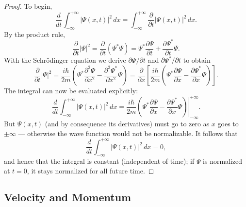 \documentclass{article}
\begin{document}
\begin{proof}
  To begin, \[
    \frac{d}{dt} \int_{-\infty}^{+\infty} |\Psi(x, t)|^2 \,dx
    = \int_{-\infty}^{+\infty} \frac{\partial}{\partial t} |\Psi(x, t)|^2 \,dx.
  \] By the product rule, \[
    \frac{\partial}{\partial t}|\Psi|^2
    = \frac{\partial}{\partial t} (\Psi^* \Psi)
    = \Psi^* \frac{\partial \Psi}{\partial t} +
    \frac{\partial \Psi^*}{\partial t} \Psi.
  \] With the Schr\"{o}dinger equation we derive $\partial\Psi/\partial t$ and
  $\partial\Psi^*/\partial t$ to obtain
  \begin{equation} \label{eq:sch-norm-1}
    \frac{\partial}{\partial t} |\Psi|^2
    = \frac{i\hbar}{2m} \left(
      \Psi^* \frac{\partial^2 \Psi}{\partial x^2} -
      \frac{\partial^2 \Psi^*}{\partial x^2} \Psi
    \right)
    = \frac{\partial}{\partial x} \left[
      \frac{i\hbar}{2m} \left(
        \Psi^* \frac{\partial \Psi}{\partial x} -
        \frac{\partial \Psi^*}{\partial x} \Psi
      \right)
    \right].
  \end{equation}
  The integral can now be evaluated explicitly: \[
    \frac{d}{dt} \int_{-\infty}^{+\infty} |\Psi(x, t)|^2 \,dx
    = \frac{i\hbar}{2m} \left.\left(
      \Psi^* \frac{\partial \Psi}{\partial x} -
      \frac{\partial \Psi^*}{\partial x} \Psi
    \right)\right|_{-\infty}^{+\infty}.
  \] But $\Psi(x, t)$ (and by consequence its derivatives) must go to zero as
  $x$ goes to $\pm\infty$ --- otherwise the wave function would not be
  normalizable. It follows that \[
    \frac{d}{dt} \int_{-\infty}^{+\infty} |\Psi(x, t)|^2 \,dx = 0,
  \] and hence that the integral is constant (independent of time); if $\Psi$
  is normalized at $t = 0$, it stays normalized for all future time.
\end{proof}

\subsection{Velocity and Momentum}
\end{document}
